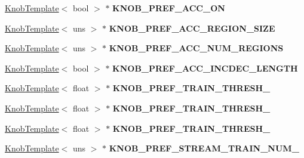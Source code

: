 \begin{DoxyCompactItemize}
\item 
\hypertarget{classall__knobs__c_a8dbab6914683d7e3d37f3f0ad99943a7}{
\hyperlink{classKnobTemplate}{KnobTemplate}$<$ bool $>$ $\ast$ {\bfseries KNOB\_\-PREF\_\-ACC\_\-ON}}
\label{classall__knobs__c_a8dbab6914683d7e3d37f3f0ad99943a7}

\item 
\hypertarget{classall__knobs__c_a7ed02c668eae9f4a0a52a438aa0e4ac1}{
\hyperlink{classKnobTemplate}{KnobTemplate}$<$ uns $>$ $\ast$ {\bfseries KNOB\_\-PREF\_\-ACC\_\-REGION\_\-SIZE}}
\label{classall__knobs__c_a7ed02c668eae9f4a0a52a438aa0e4ac1}

\item 
\hypertarget{classall__knobs__c_ac3947e6c34c8c547280f4eda86bd55cb}{
\hyperlink{classKnobTemplate}{KnobTemplate}$<$ uns $>$ $\ast$ {\bfseries KNOB\_\-PREF\_\-ACC\_\-NUM\_\-REGIONS}}
\label{classall__knobs__c_ac3947e6c34c8c547280f4eda86bd55cb}

\item 
\hypertarget{classall__knobs__c_ac800aaaa5583e29e88fc2add1bf57cf9}{
\hyperlink{classKnobTemplate}{KnobTemplate}$<$ bool $>$ $\ast$ {\bfseries KNOB\_\-PREF\_\-ACC\_\-INCDEC\_\-LENGTH}}
\label{classall__knobs__c_ac800aaaa5583e29e88fc2add1bf57cf9}

\item 
\hypertarget{classall__knobs__c_a148bff8d99fe9d16dd9a8c5aef0de129}{
\hyperlink{classKnobTemplate}{KnobTemplate}$<$ float $>$ $\ast$ {\bfseries KNOB\_\-PREF\_\-TRAIN\_\-THRESH\_}}
\label{classall__knobs__c_a148bff8d99fe9d16dd9a8c5aef0de129}

\item 
\hypertarget{classall__knobs__c_af6314e0a12ce064c65f0e843651230b9}{
\hyperlink{classKnobTemplate}{KnobTemplate}$<$ float $>$ $\ast$ {\bfseries KNOB\_\-PREF\_\-TRAIN\_\-THRESH\_}}
\label{classall__knobs__c_af6314e0a12ce064c65f0e843651230b9}

\item 
\hypertarget{classall__knobs__c_a8cead168031bd02206c6a338b706542a}{
\hyperlink{classKnobTemplate}{KnobTemplate}$<$ float $>$ $\ast$ {\bfseries KNOB\_\-PREF\_\-TRAIN\_\-THRESH\_}}
\label{classall__knobs__c_a8cead168031bd02206c6a338b706542a}

\item 
\hypertarget{classall__knobs__c_a192428346eb2668b046dbd483a060bc8}{
\hyperlink{classKnobTemplate}{KnobTemplate}$<$ uns $>$ $\ast$ {\bfseries KNOB\_\-PREF\_\-STREAM\_\-TRAIN\_\-NUM\_}}
\label{classall__knobs__c_a192428346eb2668b046dbd483a060bc8}


\end{DoxyCompactItemize}
